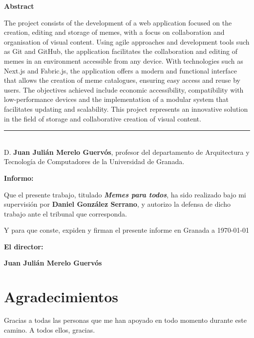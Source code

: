 \noindent\textbf{Abstract}

The project consists of the development of a web application focused on the creation, editing and storage of memes, with a focus on collaboration and organisation of visual content. Using agile approaches and development tools such as Git and GitHub, the application facilitates the collaboration and editing of memes in an environment accessible from any device. With technologies such as Next.js and Fabric.js, the application offers a modern and functional interface that allows the creation of meme catalogues, ensuring easy access and reuse by users. The objectives achieved include economic accessibility, compatibility with low-performance devices and the implementation of a modular system that facilitates updating and scalability. This project represents an innovative solution in the field of storage and collaborative creation of visual content.

\cleardoublepage

\thispagestyle{empty}

\noindent\hspace*{-\parindent}\rule[-1ex]{\textwidth}{2pt}\\[4.5ex]

D. \textbf{Juan Julián Merelo Guervós}, profesor del departamento de Arquitectura y Tecnología de Computadores de la Universidad de Granada.

\vspace{0.5cm}

\textbf{Informo:}

\vspace{0.5cm}

Que el presente trabajo, titulado \textit{\textbf{Memes para todos}},
ha sido realizado bajo mi supervisión por \textbf{Daniel González Serrano}, y autorizo la defensa de dicho trabajo ante el tribunal
que corresponda.

\vspace{0.5cm}

Y para que conste, expiden y firman el presente informe en Granada a \today

\vspace{1cm}

\textbf{El director: }

\vspace{5cm}

\noindent \textbf{Juan Julián Merelo Guervós}

\chapter*{Agradecimientos}

Gracias a todas las personas que me han apoyado en todo momento durante este camino. A todos ellos, gracias.



